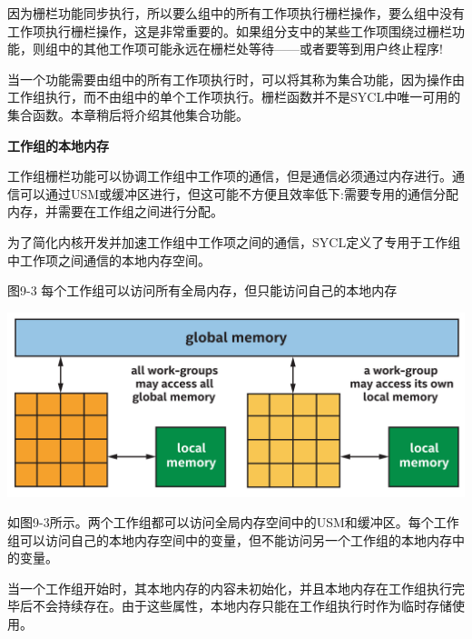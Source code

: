 因为栅栏功能同步执行，所以要么组中的所有工作项执行栅栏操作，要么组中没有工作项执行栅栏操作，这是非常重要的。如果组分支中的某些工作项围绕过栅栏功能，则组中的其他工作项可能永远在栅栏处等待——或者要等到用户终止程序!\par

\begin{tcolorbox}[colback=blue!5!white,colframe=blue!75!black, title=集合功能]
当一个功能需要由组中的所有工作项执行时，可以将其称为集合功能，因为操作由工作组执行，而不由组中的单个工作项执行。栅栏函数并不是SYCL中唯一可用的集合函数。本章稍后将介绍其他集合功能。
\end{tcolorbox}

\hspace*{\fill} \par %
\textbf{工作组的本地内存}

工作组栅栏功能可以协调工作组中工作项的通信，但是通信必须通过内存进行。通信可以通过USM或缓冲区进行，但这可能不方便且效率低下:需要专用的通信分配内存，并需要在工作组之间进行分配。\par

为了简化内核开发并加速工作组中工作项之间的通信，SYCL定义了专用于工作组中工作项之间通信的本地内存空间。\par

\hspace*{\fill} \par %
图9-3 每个工作组可以访问所有全局内存，但只能访问自己的本地内存
\begin{center}
	\includegraphics[width=1.\textwidth]{content/chapter-9/images/4}
\end{center}

如图9-3所示。两个工作组都可以访问全局内存空间中的USM和缓冲区。每个工作组可以访问自己的本地内存空间中的变量，但不能访问另一个工作组的本地内存中的变量。\par

当一个工作组开始时，其本地内存的内容未初始化，并且本地内存在工作组执行完毕后不会持续存在。由于这些属性，本地内存只能在工作组执行时作为临时存储使用。\par


